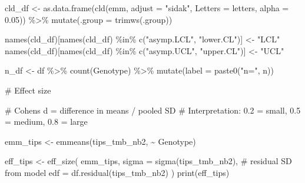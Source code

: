 \documentclass[
  letterpaper,
  DIV=11,
  numbers=noendperiod]{scrartcl}
\newenvironment{Shaded}{\begin{snugshade}}{\end{snugshade}}
\newcommand{\AttributeTok}[1]{\textcolor[rgb]{0.40,0.45,0.13}{#1}}
\newcommand{\CommentTok}[1]{\textcolor[rgb]{0.37,0.37,0.37}{#1}}
\newcommand{\FloatTok}[1]{\textcolor[rgb]{0.68,0.00,0.00}{#1}}
\newcommand{\FunctionTok}[1]{\textcolor[rgb]{0.28,0.35,0.67}{#1}}
\newcommand{\NormalTok}[1]{\textcolor[rgb]{0.00,0.23,0.31}{#1}}
\newcommand{\OtherTok}[1]{\textcolor[rgb]{0.00,0.23,0.31}{#1}}
\newcommand{\SpecialCharTok}[1]{\textcolor[rgb]{0.37,0.37,0.37}{#1}}
\newcommand{\StringTok}[1]{\textcolor[rgb]{0.13,0.47,0.30}{#1}}
\begin{document}
\begin{Shaded}
\begin{Highlighting}[]
\NormalTok{cld\_df }\OtherTok{\textless{}{-}} \FunctionTok{as.data.frame}\NormalTok{(}\FunctionTok{cld}\NormalTok{(emm, }\AttributeTok{adjust =} \StringTok{"sidak"}\NormalTok{,}
                             \AttributeTok{Letters =}\NormalTok{ letters, }\AttributeTok{alpha =} \FloatTok{0.05}\NormalTok{)) }\SpecialCharTok{\%\textgreater{}\%}
  \FunctionTok{mutate}\NormalTok{(}\AttributeTok{.group =} \FunctionTok{trimws}\NormalTok{(.group))}

\FunctionTok{names}\NormalTok{(cld\_df)[}\FunctionTok{names}\NormalTok{(cld\_df) }\SpecialCharTok{\%in\%} \FunctionTok{c}\NormalTok{(}\StringTok{"asymp.LCL"}\NormalTok{, }\StringTok{"lower.CL"}\NormalTok{)] }\OtherTok{\textless{}{-}} \StringTok{"LCL"}
\FunctionTok{names}\NormalTok{(cld\_df)[}\FunctionTok{names}\NormalTok{(cld\_df) }\SpecialCharTok{\%in\%} \FunctionTok{c}\NormalTok{(}\StringTok{"asymp.UCL"}\NormalTok{, }\StringTok{"upper.CL"}\NormalTok{)] }\OtherTok{\textless{}{-}} \StringTok{"UCL"}

\NormalTok{n\_df }\OtherTok{\textless{}{-}}\NormalTok{ df }\SpecialCharTok{\%\textgreater{}\%}
  \FunctionTok{count}\NormalTok{(Genotype) }\SpecialCharTok{\%\textgreater{}\%}
  \FunctionTok{mutate}\NormalTok{(}\AttributeTok{label =} \FunctionTok{paste0}\NormalTok{(}\StringTok{"n="}\NormalTok{, n))}


\CommentTok{\# Effect size}

\CommentTok{\# Cohen\textquotesingle{}s d = difference in means / pooled SD}
\CommentTok{\# Interpretation: 0.2 = small, 0.5 = medium, 0.8 = large}

\NormalTok{emm\_tips }\OtherTok{\textless{}{-}} \FunctionTok{emmeans}\NormalTok{(tips\_tmb\_nb2, }\SpecialCharTok{\textasciitilde{}}\NormalTok{ Genotype)}

\NormalTok{eff\_tips }\OtherTok{\textless{}{-}} \FunctionTok{eff\_size}\NormalTok{(}
\NormalTok{  emm\_tips,}
  \AttributeTok{sigma =} \FunctionTok{sigma}\NormalTok{(tips\_tmb\_nb2),   }\CommentTok{\# residual SD from model}
  \AttributeTok{edf   =} \FunctionTok{df.residual}\NormalTok{(tips\_tmb\_nb2)}
\NormalTok{)}
\FunctionTok{print}\NormalTok{(eff\_tips)}
\end{Highlighting}
\end{Shaded}
\end{document}
